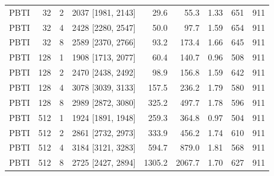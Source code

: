 \begin{tabular}{lrrrrrrrr}
PBTI & 32 & 2 & 2037 [1981, 2143] & 29.6 & 55.3 & 1.33 & 651 & 911\\
PBTI & 32 & 4 & 2428 [2280, 2547] & 50.0 & 97.7 & 1.59 & 654 & 911\\
PBTI & 32 & 8 & 2589 [2370, 2766] & 93.2 & 173.4 & 1.66 & 645 & 911\\
PBTI & 128 & 1 & 1908 [1713, 2077] & 60.4 & 140.7 & 0.96 & 508 & 911\\
PBTI & 128 & 2 & 2470 [2438, 2492] & 98.9 & 156.8 & 1.59 & 642 & 911\\
PBTI & 128 & 4 & 3078 [3039, 3133] & 157.5 & 236.2 & 1.79 & 580 & 911\\
PBTI & 128 & 8 & 2989 [2872, 3080] & 325.2 & 497.7 & 1.78 & 596 & 911\\
PBTI & 512 & 1 & 1924 [1891, 1948] & 259.3 & 364.8 & 0.97 & 504 & 911\\
PBTI & 512 & 2 & 2861 [2732, 2973] & 333.9 & 456.2 & 1.74 & 610 & 911\\
PBTI & 512 & 4 & 3184 [3121, 3283] & 594.7 & 879.0 & 1.81 & 568 & 911\\
PBTI & 512 & 8 & 2725 [2427, 2894] & 1305.2 & 2067.7 & 1.70 & 627 & 911\\
\bottomrule
\end{tabular}